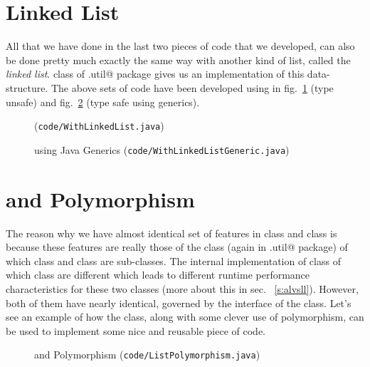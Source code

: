 \documentclass[12pt,a4paper]{article}
\begin{document}
\section{Linked List}
All that we have done in the last two pieces of code that we developed, can also be done pretty much exactly the same way with another kind of list, called the \emph{linked list}. \lstinline@LinkedList@ class of \lstinline@java.util@ package gives us an implementation of this data-structure. The above sets of code have been developed using \lstinline@LinkedList@ in fig.~\ref{f:ll} (type unsafe) and fig.~\ref{f:llg} (type safe using generics).

\begin{figure}
	
	\caption{\lstinline@LinkedList@ (\texttt{code/WithLinkedList.java})}
	\label{f:ll}
\end{figure}

\begin{figure}
	
	\caption{\lstinline@LinkedList@ using Java Generics (\texttt{code/WithLinkedListGeneric.java})}
	\label{f:llg}
\end{figure}

\section{\lstinline@List@ and Polymorphism}
The reason why we have almost identical set of features in \lstinline@LinkedList@ class and \lstinline@ArrayList@ class is because these features are really those of the \lstinline@List@ class (again in \lstinline@java.util@ package) of which \lstinline@LinkedList@ class and \lstinline@ArrayList@ class are sub-classes. The internal implementation of \lstinline@List@ class of which \lstinline@LinkedList@ class are different which leads to different runtime performance characteristics for these two classes (more about this in sec. ~\ref{s:alvsll}). However, both of them have nearly identical, governed by the interface of the \lstinline@List@ class. Let's see an example of how the \lstinline@List@ class, along with some clever use of polymorphism, can be used to implement some nice and reusable piece of code.

\begin{figure}
	
	\caption{\lstinline@List@ and Polymorphism (\texttt{code/ListPolymorphism.java})}
	\label{f:lp}
\end{figure}
\end{document}
